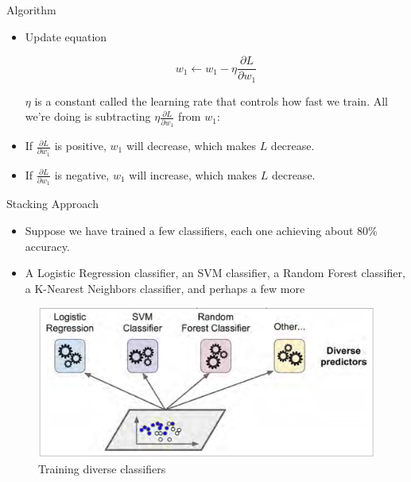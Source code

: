 \documentclass[11pt]{beamer}
\begin{document}

\begin{frame}{Algorithm} 
\vspace{-2mm}
\begin{itemize}
	\item  Update equation
	
	\[w_1\leftarrow w_1-\eta \dfrac{\partial L}{\partial w_1}\] 
	
	$\eta$ is a constant called the learning rate that controls how fast we train. All we're doing is subtracting $\eta \frac{\partial L}{\partial w_1}$ from $w_1$:
	\pause 
	\item If $\frac{\partial L}{\partial w_1}$ is positive, $w_1$ will decrease, which makes $L$ decrease.
	\pause 
	\item  If $\frac{\partial L}{\partial w_1}$ is negative, $w_1$ will increase, which makes $L$ decrease.
	\end{itemize}
\end{frame}
%



\begin{frame}{Stacking Approach}
	\begin{itemize}
		\item Suppose we have trained a few classifiers, each one achieving about 80\% accuracy.
		\pause 
\item  A Logistic Regression classifier, an SVM classifier, a Random Forest classifier, a K-Nearest Neighbors classifier, and perhaps a few more
	\end{itemize}
\begin{figure}
	\centering
	\includegraphics[scale=0.29]{figure7-1}
	\caption{Training diverse classifiers}
\end{figure}		
\end{frame}
\end{document}
